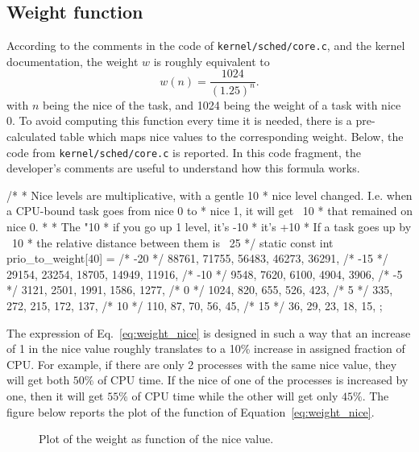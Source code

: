 \subsection{Weight function}
According to the comments in the code of \verb|kernel/sched/core.c|, and the kernel documentation, the weight $w$ is roughly equivalent to
\begin{equation}
  w(n) = \dfrac{1024}{(1.25)^{n}}.
  \label{eq:weight_nice}
\end{equation}
with $n$ being the nice of the task, and 1024 being the weight of a task with nice 0. To avoid computing this function every time it is needed, there is a pre-calculated table which maps nice
values to the corresponding weight. Below, the code from
\verb|kernel/sched/core.c| is reported. In this code fragment, the developer's comments are useful
to understand how this formula works.
\begin{code}
/*
 * Nice levels are multiplicative, with a gentle 10%
 * nice level changed. I.e. when a CPU-bound task goes from nice 0 to
 * nice 1, it will get ~10%
 * that remained on nice 0.
 *
 * The "10%
 * if you go up 1 level, it's -10%
 * it's +10%
 * If a task goes up by ~10%
 * the relative distance between them is ~25%
 */
static const int prio_to_weight[40] = {
/* -20 */ 88761, 71755, 56483, 46273, 36291,
/* -15 */ 29154, 23254, 18705, 14949, 11916,
/* -10 */ 9548, 7620, 6100, 4904, 3906,
/* -5 */ 3121, 2501, 1991, 1586, 1277,
/* 0 */ 1024, 820, 655, 526, 423,
/* 5 */ 335, 272, 215, 172, 137,
/* 10 */ 110, 87, 70, 56, 45,
/* 15 */ 36, 29, 23, 18, 15,
};
\end{code}
The expression of Eq.~\eqref{eq:weight_nice} is designed in such a way that an increase of 1 in the nice value roughly translates to a 10\% increase in assigned fraction of CPU.
For example, if there are only 2 processes with the same nice value, they will get both $50\%$ of CPU time. If the nice of one of the processes is increased by one, then it will get $55\%$ of CPU time while the other will get only $45\%$.
The figure below reports the plot of the function of Equation~\eqref{eq:weight_nice}.
\begin{figure}[htb]
\label{fig:weight_vs_nice}
\caption{Plot of the weight as function of the nice value.}
\end{figure}

